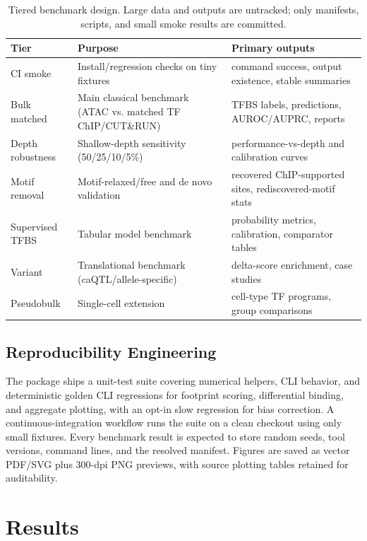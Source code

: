 \documentclass[biomedinformatics,article,submit,pdftex,moreauthors]{Definitions/mdpi}
\begin{document}
\begin{table}[H]
\caption{Tiered benchmark design. Large data and outputs are untracked; only
manifests, scripts, and small smoke results are committed.\label{tab:tiers}}
\begin{tabularx}{\textwidth}{lYY}
\toprule
\textbf{Tier} & \textbf{Purpose} & \textbf{Primary outputs}\\
\midrule
CI smoke & Install/regression checks on tiny fixtures & command success, output existence, stable summaries\\
Bulk matched & Main classical benchmark (ATAC vs. matched TF ChIP/CUT\&RUN) & TFBS labels, predictions, AUROC/AUPRC, reports\\
Depth robustness & Shallow-depth sensitivity (50/25/10/5\%) & performance-vs-depth and calibration curves\\
Motif removal & Motif-relaxed/free and de novo validation & recovered ChIP-supported sites, rediscovered-motif stats\\
Supervised TFBS & Tabular model benchmark & probability metrics, calibration, comparator tables\\
Variant & Translational benchmark (caQTL/allele-specific) & delta-score enrichment, case studies\\
Pseudobulk & Single-cell extension & cell-type TF programs, group comparisons\\
\bottomrule
\end{tabularx}
\end{table}

\subsection{Reproducibility Engineering}

The package ships a unit-test suite covering numerical helpers, CLI behavior, and
deterministic golden CLI regressions for footprint scoring, differential binding,
and aggregate plotting, with an opt-in slow regression for bias correction. A
continuous-integration workflow runs the suite on a clean checkout using only
small fixtures. Every benchmark result is expected to store random seeds, tool
versions, command lines, and the resolved manifest. Figures are saved as vector
PDF/SVG plus 300-dpi PNG previews, with source plotting tables retained for
auditability.

\section{Results}
\end{document}
